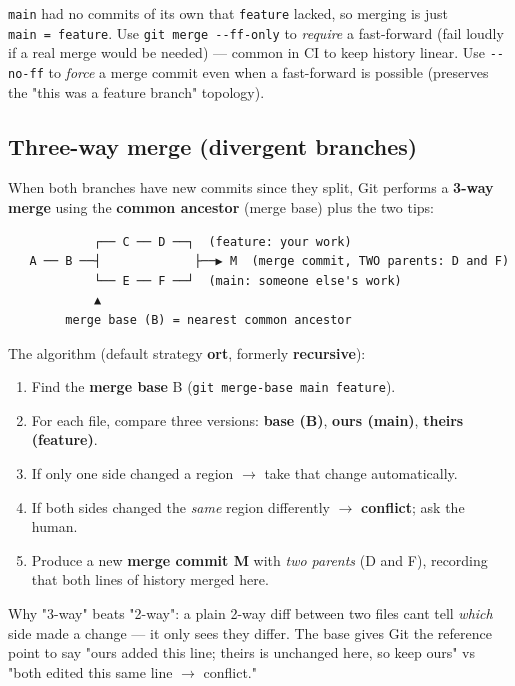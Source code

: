\documentclass[11pt]{article}
\providecommand{\tightlist}{\setlength{\itemsep}{1pt}\setlength{\parskip}{0pt}}
\begin{document}
\texttt{main} had no commits of its own that \texttt{feature} lacked, so merging is just \texttt{main\ =\ feature}. Use \texttt{git\ merge\ -\/-ff-only} to \emph{require} a fast-forward (fail loudly if a real merge would be needed) --- common in CI to keep history linear. Use \texttt{-\/-no-ff} to \emph{force} a merge commit even when a fast-forward is possible (preserves the "this was a feature branch" topology).

\subsection{Three-way merge (divergent branches)}\label{three-way-merge-divergent-branches}

When both branches have new commits since they split, Git performs a \textbf{3-way merge} using the \textbf{common ancestor} (merge base) plus the two tips:

\setcodelang{}

\begin{verbatim}
            ┌── C ── D ──┐  (feature: your work)
   A ── B ──┤             ├──▶ M  (merge commit, TWO parents: D and F)
            └── E ── F ──┘  (main: someone else's work)
            ▲
        merge base (B) = nearest common ancestor
\end{verbatim}

The algorithm (default strategy \textbf{ort}, formerly \textbf{recursive}):

\begin{enumerate}
\def\labelenumi{\arabic{enumi}.}
\tightlist
\item
  Find the \textbf{merge base} B (\texttt{git\ merge-base\ main\ feature}).
\item
  For each file, compare three versions: \textbf{base (B)}, \textbf{ours (main)}, \textbf{theirs (feature)}.
\item
  If only one side changed a region \(\rightarrow\) take that change automatically.
\item
  If both sides changed the \emph{same} region differently \(\rightarrow\) \textbf{conflict}; ask the human.
\item
  Produce a new \textbf{merge commit M} with \emph{two parents} (D and F), recording that both lines of history merged here.
\end{enumerate}

Why "3-way" beats "2-way": a plain 2-way diff between two files can\textquotesingle t tell \emph{which} side made a change --- it only sees they differ. The base gives Git the reference point to say "ours added this line; theirs is unchanged here, so keep ours" vs "both edited this same line \(\rightarrow\) conflict."
\end{document}
